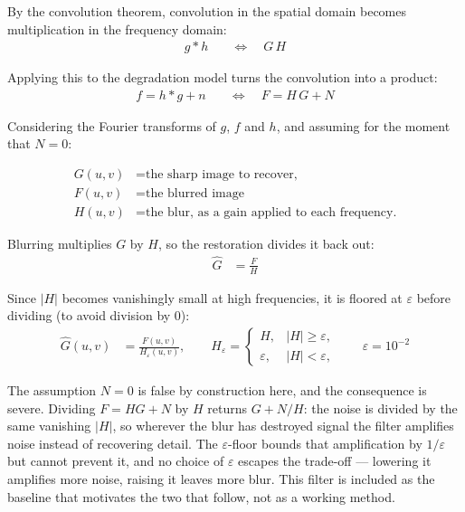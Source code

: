 \documentclass[10pt,twocolumn,letterpaper]{article}
\begin{document}
By the convolution theorem, convolution in the spatial domain becomes multiplication in the
frequency domain:
\begin{align}
  g * h \quad&\Longleftrightarrow\quad G\,H
\end{align}

\noindent Applying this to the degradation model turns the convolution into a product:
\begin{align}
  f = h * g + n
  \quad&\Longleftrightarrow\quad
  F = H\,G + N
\end{align}

\noindent Considering the Fourier transforms of $g$, $f$ and $h$, and assuming for the
moment that $N = 0$:

\begin{align}
  G(u,v) &= \text{the sharp image to recover,} \\
  F(u,v) &= \text{the blurred image} \\
  H(u,v) &= \text{the blur, as a gain applied to each frequency.}
\end{align}

\noindent Blurring multiplies $G$ by $H$, so the restoration divides it back out:
\begin{align}
  \hat{G} &= \frac{F}{H}
\end{align}

\noindent Since $|H|$ becomes vanishingly small at high frequencies, it is floored at
$\varepsilon$ before dividing (to avoid division by 0):
\begin{align}
  \hat{G}(u,v) &= \frac{F(u,v)}{H_{\varepsilon}(u,v)},
  \qquad
  H_{\varepsilon} =
  \begin{cases}
    H,          & |H| \ge \varepsilon, \\
    \varepsilon, & |H| < \varepsilon,
  \end{cases}
  \qquad \varepsilon = 10^{-2}
\end{align}

\noindent The assumption $N = 0$ is false by construction here, and the consequence is
severe. Dividing $F = HG + N$ by $H$ returns $G + N/H$: the noise is divided by the same
vanishing $|H|$, so wherever the blur has destroyed signal the filter amplifies noise
instead of recovering detail. The $\varepsilon$-floor bounds that amplification by
$1/\varepsilon$ but cannot prevent it, and no choice of $\varepsilon$ escapes the trade-off
--- lowering it amplifies more noise, raising it leaves more blur. This filter is included
as the baseline that motivates the two that follow, not as a working method.
\end{document}
